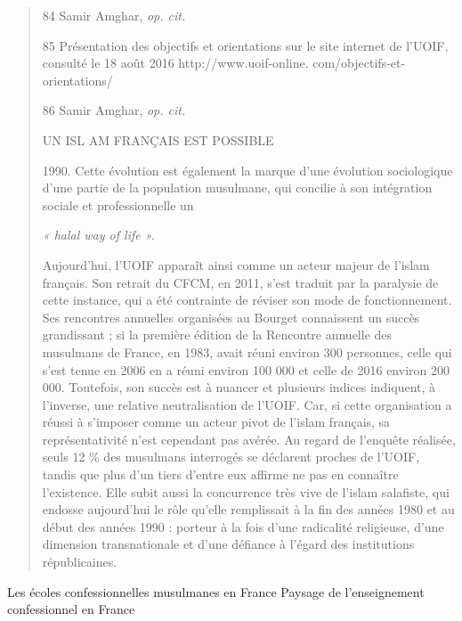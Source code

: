 \begin{quote}
84 Samir Amghar, \emph{op. cit.}

85 Présentation des objectifs et orientations sur le site internet de
l'UOIF, consulté le 18 août 2016 http://www.uoif-online.
com/objectifs-et-orientations/

86 Samir Amghar, \emph{op. cit.}

UN ISL AM FRANÇAIS EST POSSIBLE

1990. Cette évolution est également la marque d'une évolution
sociologique d'une partie de la population musulmane, qui concilie à son
intégration sociale et professionnelle un

\emph{« halal way of life ».}

Aujourd'hui, l'UOIF apparaît ainsi comme un acteur majeur de l'islam
français. Son retrait du CFCM, en 2011, s'est traduit par la paralysie
de cette instance, qui a été contrainte de réviser son mode de
fonctionnement. Ses rencontres annuelles organisées au Bourget
connaissent un succès grandissant ; si la première édition de la
Rencontre annuelle des musulmans de France, en 1983, avait réuni environ
300 personnes, celle qui s'est tenue en 2006 en a réuni environ 100 000
et celle de 2016 environ 200 000. Toutefois, son succès est à nuancer et
plusieurs indices indiquent, à l'inverse, une relative neutralisation de
l'UOIF. Car, si cette organisation a réussi à s'imposer comme un acteur
pivot de l'islam français, sa représentativité n'est cependant pas
avérée. Au regard de l'enquête réalisée, seuls 12 \% des musulmans
interrogés se déclarent proches de l'UOIF, tandis que plus d'un tiers
d'entre eux affirme ne pas en connaître l'existence. Elle subit aussi la
concurrence très vive de l'islam salafiste, qui endosse aujourd'hui le
rôle qu'elle remplissait à la fin des années 1980 et au début des années
1990 : porteur à la fois d'une radicalité religieuse, d'une dimension
transnationale et d'une défiance à l'égard des institutions
républicaines.
\end{quote}

Les écoles confessionnelles musulmanes en France Paysage de
l'enseignement confessionnel en France

